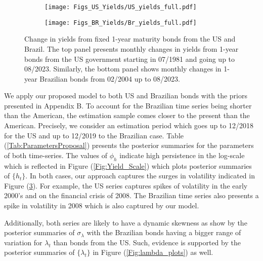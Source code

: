 \documentclass{article}
\begin{document}
\begin{figure}[h]
\centering
\begin{subfigure}[b]{0.95\textwidth}
\texttt{[image: Figs\_US\_Yields/US\_yields\_full.pdf]} 
   \label{fig:us_yields} 
\end{subfigure}
\begin{subfigure}[b]{0.95\textwidth}
\texttt{[image: Figs\_BR\_Yields/Br\_yields\_full.pdf]} 
   \label{fig:br_yields}
\end{subfigure}
\caption{Change in yields from fixed 1-year maturity bonds from the US and Brazil. The top panel presents monthly changes in yields from 1-year bonds from the US government starting in 07/1981 and going up to 08/2023. Similarly, the bottom panel shows monthly changes in 1-year Brazilian bonds from 02/2004 up to 08/2023. }
\label{Fig:Yields_time_series}
\end{figure}

We apply our proposed model to both US and Brazilian bonds with the priors presented in Appendix B. To account for the Brazilian time series being shorter than the American, the estimation sample comes closer to the present than the American. Precisely, we consider an estimation period which goes up to 12/2018 for the US and up to 12/2019 to the Brazilian case. Table (\ref{Tab:ParametersProposal}) presents the posterior summaries for the parameters of both time-series. The values of $\phi_h$ indicate high persistence in the log-scale which is reflected in Figure (\ref{Fig:Yield_Scale}) which plots posterior summaries of $\{h_t\}$. In both cases, our approach captures the surges in volatility indicated in Figure (\ref{Fig:Yields_time_series}). For example, the US series captures spikes of volatility in the early 2000's and on the financial crisis of 2008. The Brazilian time series also presents a spike in volatility in 2008 which is also captured by our model.

Additionally, both series are likely to have a dynamic skewness as show by the posterior summaries of $\sigma_{\lambda}$ with the Brazilian bonds having a bigger range of variation for $\lambda_t$ than bonds from the US. Such, evidence is supported by the posterior summaries of $\{\lambda_t\}$ in Figure (\ref{Fig:lambda_plots}) as well.  
\end{document}
